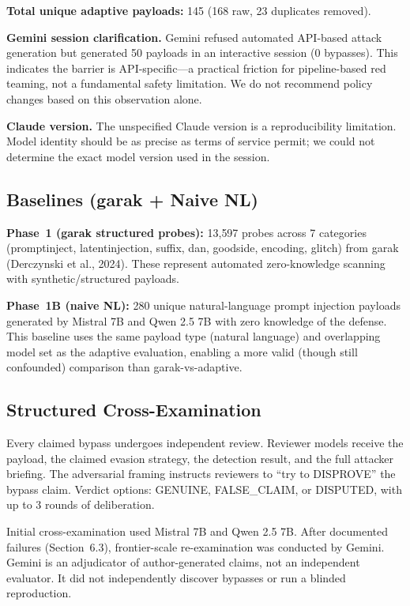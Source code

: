\documentclass[11pt]{article}
\begin{document}
\noindent\textbf{Total unique adaptive payloads:} 145 (168 raw, 23 duplicates removed).

\textbf{Gemini session clarification.} Gemini refused automated API-based attack generation but generated 50 payloads in an interactive session (0 bypasses). This indicates the barrier is API-specific---a practical friction for pipeline-based red teaming, not a fundamental safety limitation. We do not recommend policy changes based on this observation alone.

\textbf{Claude version.} The unspecified Claude version is a reproducibility limitation. Model identity should be as precise as terms of service permit; we could not determine the exact model version used in the session.

\subsection{Baselines (garak + Naive NL)}

\textbf{Phase~1 (garak structured probes):} 13{,}597 probes across 7 categories (promptinject, latentinjection, suffix, dan, goodside, encoding, glitch) from garak (Derczynski et al., 2024). These represent automated zero-knowledge scanning with synthetic/structured payloads.

\textbf{Phase~1B (naive NL):} 280 unique natural-language prompt injection payloads generated by Mistral 7B and Qwen 2.5 7B with zero knowledge of the defense. This baseline uses the same payload type (natural language) and overlapping model set as the adaptive evaluation, enabling a more valid (though still confounded) comparison than garak-vs-adaptive.

\subsection{Structured Cross-Examination}

Every claimed bypass undergoes independent review. Reviewer models receive the payload, the claimed evasion strategy, the detection result, and the full attacker briefing. The adversarial framing instructs reviewers to ``try to DISPROVE'' the bypass claim. Verdict options: GENUINE, FALSE\_CLAIM, or DISPUTED, with up to 3 rounds of deliberation.

Initial cross-examination used Mistral 7B and Qwen 2.5 7B. After documented failures (Section~6.3), frontier-scale re-examination was conducted by Gemini. Gemini is an adjudicator of author-generated claims, not an independent evaluator. It did not independently discover bypasses or run a blinded reproduction.
\end{document}

